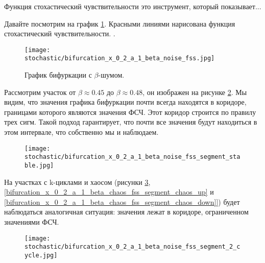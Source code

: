         Функция стохастический чувствительности это инструмент, который показывает... 


        Давайте посмотрим на график \ref{bifurcation_x_0_2_a_1_beta_chaos_fss}. Красными линиями нарисована функция стохастический чувствительности. . 

        \begin{figure}
            \centering
            \texttt{[image: stochastic/bifurcation\_x\_0\_2\_a\_1\_beta\_noise\_fss.jpg]}
        
            \captionsetup{justification=centering}
            \caption{График бифуркации с \(\beta\)-шумом.}
            \label{bifurcation_x_0_2_a_1_beta_chaos_fss}
        \end{figure}

        Рассмотрим участок от \(\beta \approx 0.45\) до \(\beta \approx 0.48\), он изображен на рисунке \ref{bifurcation_x_0_2_a_1_beta_chaos_fss_segment_stable}. Мы видим, что значения графика бифуркации почти всегда находятся в коридоре, границами которого являются значения ФСЧ. Этот коридор строится по правилу трех сигм. Такой подход гарантирует, что почти все значения будут находиться в этом интервале, что собственно мы и наблюдаем.

        \begin{figure}
            \centering
            \texttt{[image: stochastic/bifurcation\_x\_0\_2\_a\_1\_beta\_noise\_fss\_segment\_stable.jpg]}
        
            \captionsetup{justification=centering}
            \caption{}
            \label{bifurcation_x_0_2_a_1_beta_chaos_fss_segment_stable}
        \end{figure}

        На участках с k-циклами и хаосом (рисунки \ref{bifurcation_x_0_2_a_1_beta_chaos_fss_segment_2_cycle}, \ref{bifurcation_x_0_2_a_1_beta_chaos_fss_segment_chaos_up} и \ref{bifurcation_x_0_2_a_1_beta_chaos_fss_segment_chaos_down]}) будет наблюдаться аналогичная ситуация: значения лежат в коридоре, ограниченном значениями ФСЧ.

        \begin{figure}
            \centering
            \texttt{[image: stochastic/bifurcation\_x\_0\_2\_a\_1\_beta\_noise\_fss\_segment\_2\_cycle.jpg]}
        
            \captionsetup{justification=centering}
            \caption{}
            \label{bifurcation_x_0_2_a_1_beta_chaos_fss_segment_2_cycle}
        \end{figure}

